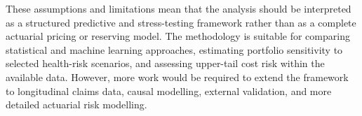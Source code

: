 	These assumptions and limitations mean that the analysis should be interpreted as a structured predictive and stress-testing framework rather than as a complete actuarial pricing or reserving model. The methodology is suitable for comparing statistical and machine learning approaches, estimating portfolio sensitivity to selected health-risk scenarios, and assessing upper-tail cost risk within the available data. However, more work would be required to extend the framework to longitudinal claims data, causal modelling, external validation, and more detailed actuarial risk modelling.